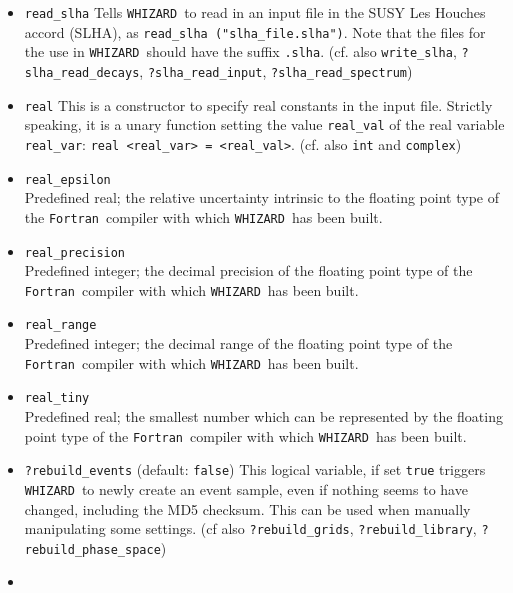 \documentclass[12pt]{book}
\newcommand{\ttt}[1]{\texttt{#1}}
\newcommand{\whizard}{\texttt{WHIZARD}}
\newcommand{\fortran}{\texttt{Fortran}}
\begin{document}
\begin{itemize}
\ttt{?read\_raw} \qquad (default: \ttt{true}) \newline
This flag demands \whizard\ to (try to) read events (from the internal
binary format) first before generating new ones. (cf. \ttt{simulate},
\ttt{?write\_raw}, \ttt{\$sample}, \ttt{sample\_format})
\item
\ttt{read\_slha} \newline
Tells \whizard\ to read in an input file in the SUSY Les Houches accord
(SLHA), as \ttt{read\_slha ("slha\_file.slha")}. Note that the files
for the use in \whizard\ should have the suffix \ttt{.slha}.
(cf. also \ttt{write\_slha}, \ttt{?slha\_read\_decays},
\ttt{?slha\_read\_input}, \ttt{?slha\_read\_spectrum})
\item
\ttt{real} \newline
This is a constructor to specify real constants in the input
file. Strictly speaking, it is a unary function setting the value
\ttt{real\_val} of the real variable \ttt{real\_var}: 
\ttt{real <real\_var> = <real\_val>}. (cf. also \ttt{int} and
\ttt{complex}) 
\item
\ttt{real\_epsilon}\\
Predefined real; the relative uncertainty intrinsic to the floating
point type of the \fortran\ compiler with which \whizard\ has been
built. 
\item
\ttt{real\_precision}\\
Predefined integer; the decimal precision of the floating point type
of the \fortran\ compiler with which \whizard\ has been built.
\item
\ttt{real\_range}\\
Predefined integer; the decimal range of the floating point type of
the \fortran\ compiler with which \whizard\ has been built.
\item
\ttt{real\_tiny}\\
Predefined real; the smallest number which can be represented by the
floating point type of the \fortran\ compiler with which \whizard\ has
been built.
\item
\ttt{?rebuild\_events} \qquad (default: \ttt{false}) \newline
This logical variable, if set \ttt{true} triggers \whizard\ to newly
create an event sample, even if nothing seems to have changed,
including the MD5 checksum. This can be used when manually
manipulating some settings. (cf also \ttt{?rebuild\_grids},
\ttt{?rebuild\_library}, \ttt{?rebuild\_phase\_space}) 
\item

\end{itemize}
\end{document}
